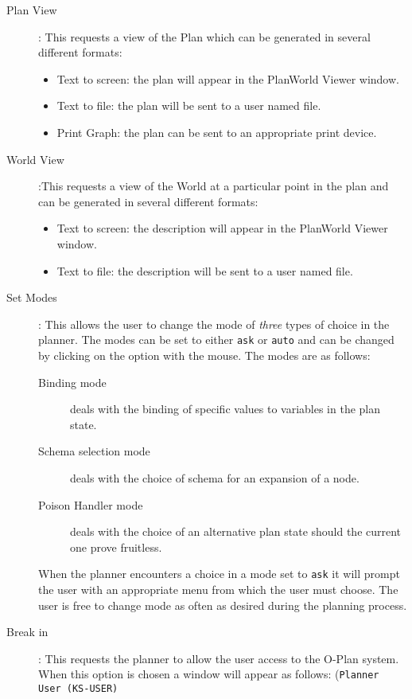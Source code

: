 \begin{description}
\item[Plan View]: This requests a view of the Plan which can be
generated in several different formats:
\begin{itemize}
\item Text to screen: the plan will appear in the PlanWorld Viewer window.
\item Text to file: the plan will be sent to a user named file.
\item Print Graph: the plan can be sent to an appropriate print device.
\end{itemize}

\item[World View]:This requests a view of the World at a particular
point in the plan and can be generated in several different formats:
\begin{itemize}
\item Text to screen: the description will appear in the PlanWorld
Viewer window. 
\item Text to file: the description will be sent to a user named file.
\end{itemize}

\item[Set Modes]:
This allows the user to change the mode of {\em three} types of choice
in the planner. The modes can be set to either {\tt ask} or {\tt auto}
and can be changed by clicking on the option with the mouse. The modes
are as follows:

\begin{description}
\item[Binding mode] deals with the binding of specific values to
variables in the plan state.
\item[Schema selection mode] deals with the choice of schema for an
expansion of a node.
\item[Poison Handler mode] deals with the choice of an alternative
plan state should the current one prove fruitless.
\end{description}

When the planner encounters a choice in a mode set to {\tt ask} it
will prompt the user with an appropriate menu from which the user must
choose. The user is free to change mode as often as desired during the
planning process. 

\item[Break in]: This requests the planner to allow the user access to
the O-Plan system. When this option is chosen a window will appear as
follows: ({\tt Planner User (KS-USER)}


\end{description}
